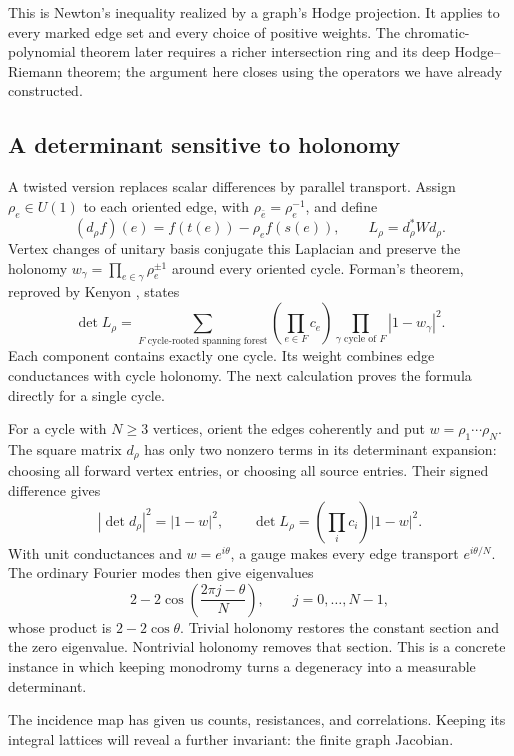 \documentclass[11pt]{article}
\theoremstyle{definition}
\theoremstyle{remark}
\begin{document}
This is Newton's inequality realized by a graph's Hodge projection.
It applies to every marked edge set and every choice of positive weights.
The chromatic-polynomial theorem later requires a richer intersection
ring and its deep Hodge--Riemann theorem; the argument here closes using
the operators we have already constructed.

\subsection{A determinant sensitive to holonomy}

A twisted version replaces scalar differences by parallel transport. Assign $\rho_e\in U(1)$ to each oriented edge, with $\rho_{\bar e}=\rho_e^{-1}$, and define
\[
 (d_\rho f)(e)=f(t(e))-\rho_e f(s(e)),\qquad
 L_\rho=d_\rho^*W d_\rho.
\]
Vertex changes of unitary basis conjugate this Laplacian and preserve the holonomy $w_\gamma=\prod_{e\in\gamma}\rho_e^{\pm1}$ around every oriented cycle. Forman's theorem, reproved by Kenyon \cite{glinKenyon2011}, states
\begin{equation}\label{eq:glin-crsf}
 \det L_\rho=
 \sum_{F\text{ cycle-rooted spanning forest}}
 \left(\prod_{e\in F}c_e\right)
 \prod_{\gamma\text{ cycle of }F}|1-w_\gamma|^2.
\end{equation}
Each component contains exactly one cycle. Its weight combines edge conductances with cycle holonomy. The next calculation proves the formula directly for a single cycle.

For a cycle with $N\ge3$ vertices, orient the edges coherently and put $w=\rho_1\cdots\rho_N$. The square matrix $d_\rho$ has only two nonzero terms in its determinant expansion: choosing all forward vertex entries, or choosing all source entries. Their signed difference gives
\[
 |\det d_\rho|^2=|1-w|^2,
 \qquad
 \det L_\rho=\left(\prod_i c_i\right)|1-w|^2.
\]
With unit conductances and $w=e^{i\theta}$, a gauge makes every edge transport $e^{i\theta/N}$. The ordinary Fourier modes then give eigenvalues
\[
 2-2\cos\left(\frac{2\pi j-\theta}{N}\right),
 \qquad j=0,\ldots,N-1,
\]
whose product is $2-2\cos\theta$. Trivial holonomy restores the constant section and the zero eigenvalue. Nontrivial holonomy removes that section. This is a concrete instance in which keeping monodromy turns a degeneracy into a measurable determinant.

The incidence map has given us counts, resistances, and correlations. Keeping its integral lattices will reveal a further invariant: the finite graph Jacobian.
\end{document}
